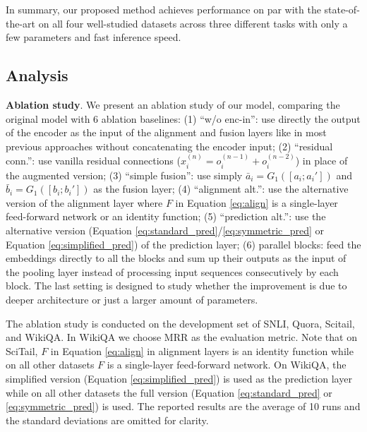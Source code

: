 \documentclass[11pt,a4paper]{article}
\begin{document}
In summary, our proposed method achieves performance on par with the state-of-the-art on all four well-studied datasets across three different tasks with only a few parameters and fast inference speed. 

\subsection{Analysis}

{\bf Ablation study}. 
We present an ablation study of our model, comparing the original model with 6 ablation baselines: (1) ``w/o enc-in'': use directly the output of the encoder as the input of the alignment and fusion layers like in most previous approaches without concatenating the encoder input; (2) ``residual conn.'': use vanilla residual connections ($x^{(n)}_i = o^{(n-1)}_i + o^{(n-2)}_i$) in place of the augmented version; (3) ``simple fusion'': use simply $\bar a_i = G_1([a_i; a_i'])$ and $\bar b_i = G_1([b_i; b_i'])$ as the fusion layer; (4) ``alignment alt.'': use the alternative version of the alignment layer where $F$ in Equation \ref{eq:align} is a single-layer feed-forward network or an identity function; (5) ``prediction alt.'': use the alternative version (Equation \ref{eq:standard_pred}/\ref{eq:symmetric_pred} or Equation \ref{eq:simplified_pred}) of the prediction layer; (6) parallel blocks: feed the embeddings directly to all the blocks and sum up their outputs as the input of the pooling layer instead of processing input sequences consecutively by each block. The last setting is designed to study whether the improvement is due to deeper architecture or just a larger amount of parameters. 

The ablation study is conducted on the development set of SNLI, Quora, Scitail, and WikiQA. In WikiQA we choose MRR as the evaluation metric. Note that on SciTail, $F$ in Equation \ref{eq:align} in alignment layers is an identity function while on all other datasets $F$ is a single-layer feed-forward network. On WikiQA, the simplified version (Equation \ref{eq:simplified_pred}) is used as the prediction layer while on all other datasets the full version (Equation \ref{eq:standard_pred} or \ref{eq:symmetric_pred}) is used. The reported results are the average of 10 runs and the standard deviations are omitted for clarity.
\end{document}
